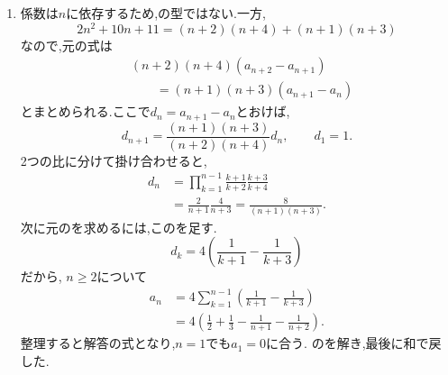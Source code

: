 \begin{enumerate}[label=\textbf{問\arabic*.},leftmargin=3.8em,format=\bookitemlink{practice-advanced}{solution}{problem}]
    この式で$c_n=1,-1$を代入すると,次の項も同じ値になる.そこで,それぞれとの差を計算すると,
    \[
      c_{n+1}+1
      =\frac{(n+2)(c_n+1)}{c_n+n+1}.
    \]
    同じ分母が消えるように,
    \[
      b_n=\frac{c_n-1}{c_n+1}
    \]
    とおけば,
    \[
      b_{n+1}=\frac{n}{n+2}b_n,\qquad b_1=\frac12.
    \]
    よって,
    \[
      b_n
      =\frac12\prod_{k=1}^{n-1}\frac{k}{k+2}
      =\frac{1}{n(n+1)}.
    \]
    $c_n=\frac{1+b_n}{1-b_n}$だから,
    \[
      c_n=\frac{n(n+1)+1}{n(n+1)-1}.
    \]
    最後に$a_n=nc_n$で戻す.両辺を割る変形から分数型,型へ順に変えた.

    \noindent \textbf{【別解】}\\
    $c_n$の式から$u_n=\frac{1}{c_n-1}$とおいてもよい.
    \[
      u_{n+1}=\frac{n+2}{n}u_n+\frac1n.
    \]
    定数$\frac{1}{2}$を加えると,
    \[
      u_{n+1}+\frac12
      =\frac{n+2}{n}\left(u_n+\frac12\right).
    \]
    $u_1=\frac{1}{2}$から, $u_n+\frac{1}{2}=\frac{n(n+1)}{2}$を得る.二つの不動点との差の比を取る方法と,一つの不動点との差の逆数を取ってから定数を加える方法が,同じ答えを与える.
  \item 係数は$n$に依存するため,の型ではない.一方,
    \[
      2n^2+10n+11
      =(n+2)(n+4)+(n+1)(n+3)
    \]
    なので,元の式は
    \begin{align*}
      &(n+2)(n+4)(a_{n+2}-a_{n+1})\\
      &\qquad=(n+1)(n+3)(a_{n+1}-a_n)
    \end{align*}
    とまとめられる.ここで$d_n=a_{n+1}-a_n$とおけば,
    \[
      d_{n+1}
      =\frac{(n+1)(n+3)}{(n+2)(n+4)}d_n,
      \qquad d_1=1.
    \]
    2つの比に分けて掛け合わせると,
    \begin{align*}
      d_n
      &=\prod_{k=1}^{n-1}
      \frac{k+1}{k+2}\frac{k+3}{k+4}\\
      &=\frac2{n+1}\frac4{n+3}
      =\frac8{(n+1)(n+3)}.
    \end{align*}
    次に元のを求めるには,このを足す.
    \[
      d_k=4\left(\frac1{k+1}-\frac1{k+3}\right)
    \]
    だから, $n\ge2$について
    \begin{align*}
      a_n
      &=4\sum_{k=1}^{n-1}
      \left(\frac1{k+1}-\frac1{k+3}\right)\\
      &=4\left(\frac12+\frac13
      -\frac1{n+1}-\frac1{n+2}\right).
    \end{align*}
    整理すると解答の式となり,$n=1$でも$a_1=0$に合う.
    のを解き,最後に和で戻した.


\end{enumerate}
